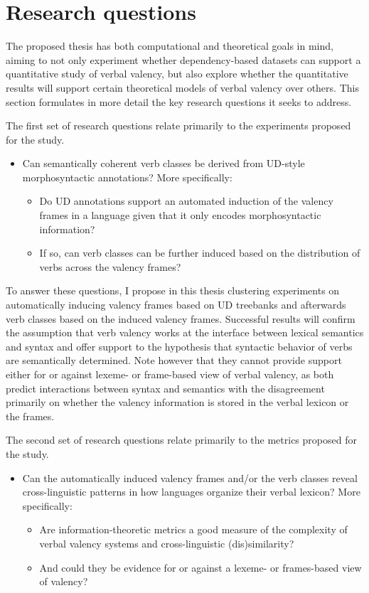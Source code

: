 \section{Research questions}\label{sec:rqs}

The proposed thesis has both computational and theoretical goals in mind, aiming to not only experiment whether dependency-based datasets can support a quantitative study of verbal valency, but also explore whether the quantitative results will support certain theoretical models of verbal valency over others. This section formulates in more detail the key research questions it seeks to address.

The first set of research questions relate primarily to the experiments proposed for the study. 
\begin{itemize}
    \item Can semantically coherent verb classes be derived from UD-style morphosyntactic annotations? More specifically:
    \begin{itemize}
        \item Do UD annotations support an automated induction of the valency frames in a language given that it only encodes morphosyntactic information?
        \item If so, can verb classes can be further induced based on the distribution of verbs across the valency frames? 
    \end{itemize} 
\end{itemize}

To answer these questions, I propose in this thesis clustering experiments on automatically inducing valency frames based on UD treebanks and afterwards verb classes based on the induced valency frames. Successful results will confirm the assumption that verb valency works at the interface between lexical semantics and syntax and offer support to the hypothesis that syntactic behavior of verbs are semantically determined. Note however that they cannot provide support either for or against lexeme- or frame-based view of verbal valency, as both predict interactions between syntax and semantics with the disagreement primarily on whether the valency information is stored in the verbal lexicon or the frames.

The second set of research questions relate primarily to the metrics proposed for the study.
\begin{itemize}
    \item Can the automatically induced valency frames and/or the verb classes reveal cross-linguistic patterns in how languages organize their verbal lexicon? More specifically:
    \begin{itemize}
        \item Are information-theoretic metrics a good measure of the complexity of verbal valency systems and cross-linguistic (dis)similarity? 
        \item And could they be evidence for or against a lexeme- or frames-based view of valency?
    \end{itemize} 
\end{itemize}

